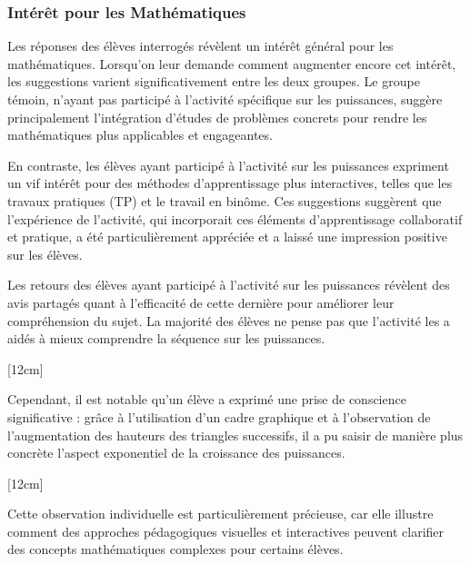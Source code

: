 \subsubsection{Intérêt pour les Mathématiques}

Les réponses des élèves interrogés révèlent un intérêt général pour les mathématiques.
Lorsqu'on leur demande comment augmenter encore cet intérêt,
les suggestions varient significativement entre les deux groupes.
Le groupe témoin,
n'ayant pas participé à l'activité spécifique sur les puissances,
suggère principalement l'intégration d'études de problèmes concrets pour rendre les mathématiques plus applicables et engageantes.

\vspace*{0.5cm}

En contraste,
les élèves ayant participé à l'activité sur les puissances expriment un vif intérêt pour des méthodes d'apprentissage plus interactives,
telles que les travaux pratiques (TP) et le travail en binôme.
Ces suggestions suggèrent que l'expérience de l'activité,
qui incorporait ces éléments d'apprentissage collaboratif et pratique,
a été particulièrement appréciée et a laissé une impression positive sur les élèves.

\vspace*{0.5cm}

Les retours des élèves ayant participé à l'activité sur les puissances révèlent des avis partagés quant à l'efficacité de cette dernière pour améliorer leur compréhension du sujet.
La majorité des élèves ne pense pas que l'activité les a aidés à mieux comprendre la séquence sur les puissances.

[12cm]

Cependant,
il est notable qu'un élève a exprimé une prise de conscience significative :
grâce à l'utilisation d'un cadre graphique et à l'observation de l'augmentation des hauteurs des triangles successifs,
il a pu saisir de manière plus concrète l'aspect exponentiel de la croissance des puissances.

[12cm]

Cette observation individuelle est particulièrement précieuse,
car elle illustre comment des approches pédagogiques visuelles et interactives peuvent clarifier des concepts mathématiques complexes pour certains élèves.